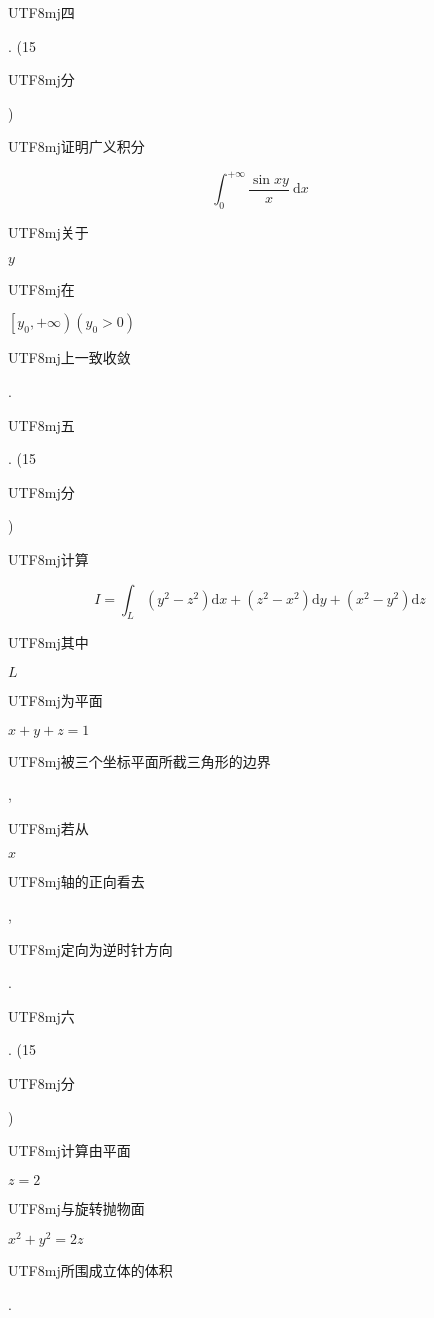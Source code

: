 \documentclass[10pt]{article}
\begin{document}
\begin{CJK}{UTF8}{mj}四\end{CJK}. (15 \begin{CJK}{UTF8}{mj}分\end{CJK}) \begin{CJK}{UTF8}{mj}证明广义积分\end{CJK}
$$
\int_{0}^{+\infty} \frac{\sin x y}{x} \mathrm{~d} x
$$
\begin{CJK}{UTF8}{mj}关于\end{CJK} $y$ \begin{CJK}{UTF8}{mj}在\end{CJK} $\left[y_{0},+\infty\right)\left(y_{0}>0\right)$ \begin{CJK}{UTF8}{mj}上一致收敛\end{CJK}.

\begin{CJK}{UTF8}{mj}五\end{CJK}. (15 \begin{CJK}{UTF8}{mj}分\end{CJK}) \begin{CJK}{UTF8}{mj}计算\end{CJK}
$$
I=\int_{L}\left(y^{2}-z^{2}\right) \mathrm{d} x+\left(z^{2}-x^{2}\right) \mathrm{d} y+\left(x^{2}-y^{2}\right) \mathrm{d} z
$$
\begin{CJK}{UTF8}{mj}其中\end{CJK} $L$ \begin{CJK}{UTF8}{mj}为平面\end{CJK} $x+y+z=1$ \begin{CJK}{UTF8}{mj}被三个坐标平面所截三角形的边界\end{CJK}, \begin{CJK}{UTF8}{mj}若从\end{CJK} $x$ \begin{CJK}{UTF8}{mj}轴的正向看去\end{CJK}, \begin{CJK}{UTF8}{mj}定向为逆时针方向\end{CJK}.

\begin{CJK}{UTF8}{mj}六\end{CJK}. (15 \begin{CJK}{UTF8}{mj}分\end{CJK}) \begin{CJK}{UTF8}{mj}计算由平面\end{CJK} $z=2$ \begin{CJK}{UTF8}{mj}与旋转抛物面\end{CJK} $x^{2}+y^{2}=2 z$ \begin{CJK}{UTF8}{mj}所围成立体的体积\end{CJK}.
\end{document}
